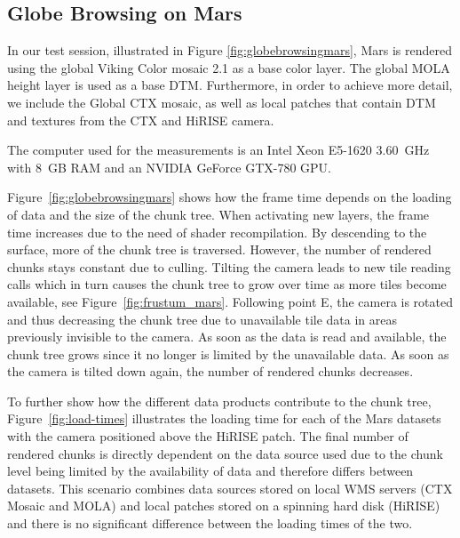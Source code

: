 \documentclass[journal]{vgtc}                %
\newcommand{\fig}[1]{Figure~\ref{fig:#1}}
\begin{document}
\subsection{Globe Browsing on Mars}



In our test session, illustrated in Figure \ref{fig:globebrowsingmars}, Mars is rendered using the global Viking Color mosaic 2.1 as a base color layer.
The global MOLA height layer is used as a base DTM.
Furthermore, in order to achieve more detail, we include the Global CTX mosaic, as well as local patches that contain DTM and textures from the CTX and HiRISE camera.

The computer used for the measurements is an Intel Xeon E5-1620 3.60~GHz with 8~GB RAM and an NVIDIA GeForce GTX-780 GPU.

\fig{globebrowsingmars} shows how the frame time depends on the loading of data and the size of the chunk tree.
When activating new layers, the frame time increases due to the need of shader recompilation.
By descending to the surface, more of the chunk tree is traversed. However, the number of rendered chunks stays constant due to culling.
Tilting the camera leads to new tile reading calls which in turn causes the chunk tree to grow over time as more tiles become available, see \fig{frustum_mars}.
Following point E, the camera is rotated and thus decreasing the chunk tree due to unavailable tile data in areas previously invisible to the camera.
As soon as the data is read and available, the chunk tree grows since it no longer is limited by the unavailable data.
As soon as the camera is tilted down again, the number of rendered chunks decreases.

To further show how the different data products contribute to the chunk tree, \fig{load-times} illustrates the loading time for each of the Mars datasets with the camera positioned above the HiRISE patch.
The final number of rendered chunks is directly dependent on the data source used due to the chunk level being limited by the availability of data and therefore differs between datasets.
This scenario combines data sources stored on local WMS servers (CTX Mosaic and MOLA) and local patches stored on a spinning hard disk (HiRISE) and there is no significant difference between the loading times of the two.
\end{document}
